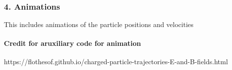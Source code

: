 \documentclass[11pt]{article}
\begin{document}
    \begin{center}
    \end{center}
    { \hspace*{\fill} \\}
    
    \hypertarget{animations}{%
\subsubsection{4. Animations}\label{animations}}

This includes animations of the particle positions and velocities

    \hypertarget{credit-for-aruxiliary-code-for-animation}{%
\paragraph{Credit for aruxiliary code for
animation}\label{credit-for-aruxiliary-code-for-animation}}

https://flothesof.github.io/charged-particle-trajectories-E-and-B-fields.html
\end{document}
